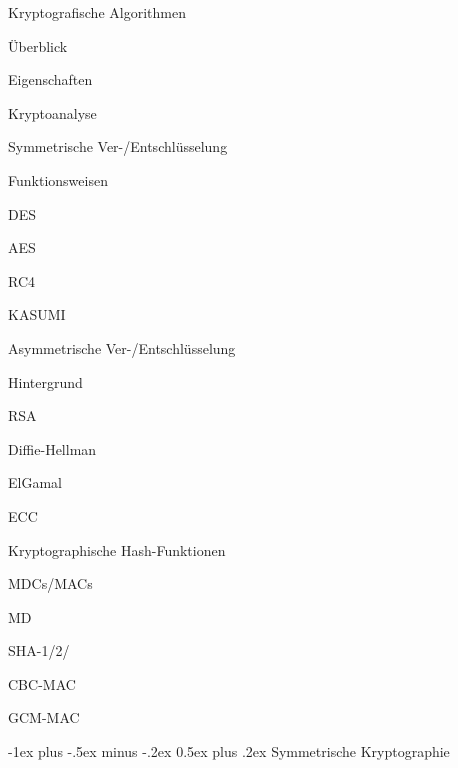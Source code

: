 \documentclass[a4paper]{article}
\makeatletter
\renewcommand{\section}{\@startsection{section}{1}{0mm}%
 {-1ex plus -.5ex minus -.2ex}%
 {0.5ex plus .2ex}%
 {\normalfont\large\bfseries}}
\makeatother
\begin{document}
\begin{multicols}{3}
      Kryptografische Algorithmen

      \begin{itemize*}
            \item Überblick
            \begin{itemize*}
                  \item Eigenschaften
                  \item Kryptoanalyse
            \end{itemize*}
            \item Symmetrische Ver-/Entschlüsselung
            \begin{itemize*}
                  \item Funktionsweisen
                  \item DES
                  \item AES
                  \item RC4
                  \item KASUMI
            \end{itemize*}
            \item Asymmetrische Ver-/Entschlüsselung
            \begin{itemize*}
                  \item Hintergrund
                  \item RSA
                  \item Diffie-Hellman
                  \item ElGamal
                  \item ECC
            \end{itemize*}
            \item Kryptographische Hash-Funktionen
            \begin{itemize*}
                  \item MDCs/MACs
                  \item MD
                  \item SHA-1/2/
                  \item CBC-MAC
                  \item GCM-MAC
            \end{itemize*}
      \end{itemize*}


      \section{Symmetrische Kryptographie}


\end{multicols}
\end{document}
